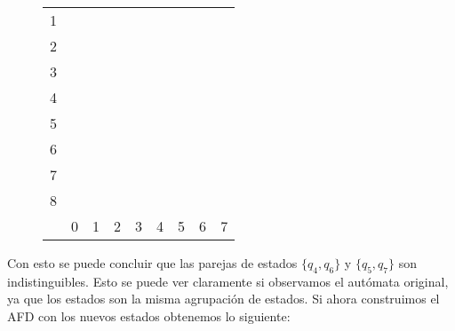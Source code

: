 \documentclass[11pt,a4paper]{article}
\begin{document}
		\begin{figure}[H]
			\centering
			\begin{tabular}{*{9}{c|}}
																							\cline{2-2}
				1 & \color{blue}{X}															\\ \cline{2-3}
				2 & \color{blue}{X} & \color{red}{X}										\\ \cline{2-4}
				3 & \color{blue}{X} & \color{red}{X} &	\color{red}{X} 						\\ \cline{2-5}
				4 & \color{red}{X} & \color{blue}{X} & \color{blue}{X} & \color{blue}{X}	\\ \cline{2-6}
				5 & \color{red}{X} & \color{blue}{X} & \color{blue}{X} & \color{blue}{X} & \color{red}{X} \\ \cline{2-7}
				6 & \color{red}{X} & \color{blue}{X} & \color{blue}{X} & \color{blue}{X} &
				  & \color{red}{X} \\ \cline{2-8}
				7 & \color{red}{X} & \color{blue}{X} & \color{blue}{X} & \color{blue}{X} & \color{red}{X} & 
				  & \color{red}{X} \\ \cline{2-9}
				8 & \color{blue}{X} & \color{red}{X} & \color{red}{X} & \color{red}{X} & \color{blue}{X} & \color{blue}{X} &
					\color{blue}{X} & \color{blue}{X} \\ \cline{2-9}
				\multicolumn{0}{c}{} & \multicolumn{1}{c}{0} & \multicolumn{1}{c}{1} & \multicolumn{1}{c}{2}
				& \multicolumn{1}{c}{3} & \multicolumn{1}{c}{4} & \multicolumn{1}{c}{5} & \multicolumn{1}{c}{6}
				& \multicolumn{1}{c}{7}
			\end{tabular}
		\end{figure}
		
		Con esto se puede concluir que las parejas de estados $\{q_4, q_6\}$ y $\{q_5, q_7\}$ son indistinguibles. Esto
		se puede ver claramente si observamos el autómata original, ya que los estados son la misma agrupación de estados.
		Si ahora construimos el AFD con los nuevos estados obtenemos lo siguiente:
		
		\begin{figure}[H]
			\centering
		\end{figure}
		
\end{document}
